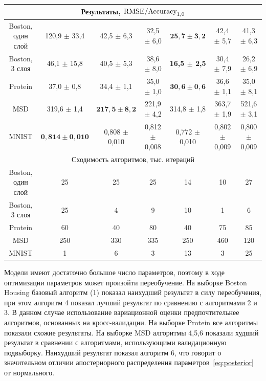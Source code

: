 \begin{table}[htbp!]
\begin{tabular}{ | c | c | c | c | c | c | c |}
\multicolumn{7}{|c|}{Результаты, $\textnormal{RMSE/Accuracy}_{1,0}$}  \\
\hline
\specialcell{ Boston,  \\один  слой} & 120,9 $\pm$ 33,4 & 42,5 $\pm$ 6,3 & 32,5 $\pm$ 6,0 & $\mathbf{25,7 \pm 3,2}$ & 42,4 $\pm$ 5,7 & 41,3 $\pm$ 6,3  \\
\hline
Boston, 3 слоя & 46,1 $\pm$ 15,8 & 40,5 $\pm$ 5,3 & 38,6 $\pm$ 8,0 & \bf 16,5 $\pm$ 2,5 & 30,4 $\pm$ 7,9 & 26,2 $\pm$ 6,9 \\
\hline
Protein & 37,0 $\pm$ 0,8 & 34,4 $\pm$ 1,1 & 35,0 $\pm$ 1,0 & $\mathbf{30,6 \pm 0,6}$ & 36,6 $\pm$ 1,1 & 35,0 $\pm$ 8,1 \\
\hline
MSD & 319,6 $\pm$ 1,4 & $\mathbf{217,5 \pm 8,2}$ & 221,9 $\pm$ 4,2 & 314,8 $\pm$ 1,8 & 363,7 $\pm$ 1,9 & 521,6 $\pm$ 3,1  \\
\hline
MNIST & $\mathbf{0,814 \pm 0,010 }$& 0,808 $\pm$ 0,010 &  0,812 $\pm$ 0,008 & 0,772 $\pm$ 0,010 & 0,802 $\pm$ 0,009 & 0,800 $\pm$ 0,009 \\
\hline


\multicolumn{7}{|c|}{Сходимость алгоритмов, тыс. итераций  }  \\
\hline
\specialcell{ Boston,  \\один  слой} &  25 & 25 & 25 & 14 & 10 & 27 \\
\hline
Boston, 3 слоя &  25 & 4 & 9 & 10 & 1 & 6 \\
\hline
Protein &   60 & 40 & 80 & 40 & 75 & 85 \\
\hline
MSD &  250 & 330 & 335 &  250 & 460 & 120  \\
\hline
MNIST &  1 & 6 & 3 &  13 & 3 & 25  \\
\hline
\end{tabular}
\end{table}





Модели имеют достаточно большое число параметров, поэтому в ходе оптимизации параметров может произойти переобучение. На выборке Boston Housing базовый алгоритм (1) показал наихудший результат в силу переобучения, при этом алгоритм 4 показал лучший результат по сравнению с алгоритмами 2 и 3. 
В данном случае использование вариационной оценки предпочтительнее алгоритмов, основанных на кросс-валидации. На выборке Protein все алгоритмы показали схожие результаты. На выборке MSD алгоритмы 4,5,6 показали худший результат в сравнении с алгоритмами, использующими валидационную подвыборку. Наихудший результат показал алгоритм 6, что говорит о значительном отличии апостериорного распределения параметров~\eqref{eq:posterior} от нормального.  

